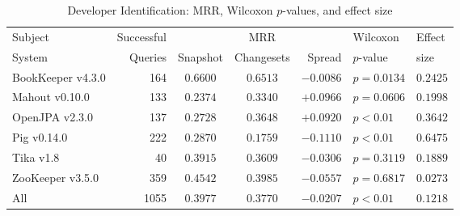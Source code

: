 \begin{table}[t]
\centering
\caption{Developer Identification: MRR, Wilcoxon $p$-values, and effect size}
\begin{tabular}{l|r|ccr|ll}
\toprule
Subject & Successful &    & MRR &        & Wilcoxon  & Effect \\
System  & Queries    & Snapshot & Changesets  & Spread & $p$-value & size \\
\midrule
BookKeeper v4.3.0 & 164 & $\bm{0.6600}$ & $0.6513$ & $-0.0086$ & $p = 0.0134$ & $0.2425$ \\
Mahout v0.10.0 & 133 & $0.2374$ & $\bm{0.3340}$ & $+0.0966$ & $p = 0.0606$ & $0.1998$ \\
OpenJPA v2.3.0 & 137 & $0.2728$ & $\bm{0.3648}$ & $+0.0920$ & $p < 0.01$ & $0.3642$ \\
Pig v0.14.0 & 222 & $\bm{0.2870}$ & $0.1759$ & $-0.1110$ & $p < 0.01$ & $0.6475$ \\
Tika v1.8 & 40 & $\bm{0.3915}$ & $0.3609$ & $-0.0306$ & $p = 0.3119$ & $0.1889$ \\
ZooKeeper v3.5.0 & 359 & $\bm{0.4542}$ & $0.3985$ & $-0.0557$ & $p = 0.6817$ & $0.0273$ \\
\midrule
All & 1055 & $\bm{0.3977}$ & $0.3770$ & $-0.0207$ & $p < 0.01$ & $0.1218$ \\
\bottomrule
\end{tabular}
\label{table:triage_rq1}
\end{table}
